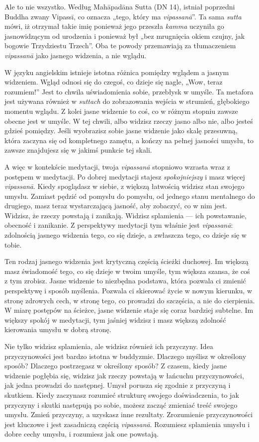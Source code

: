\documentclass[12pt,openany]{book}
\begin{document}
Ale to nie wszystko. Według Mahāpadāna Sutta (DN 14), istniał poprzedni Buddha zwany Vipassī, co oznacza „tego, który ma \textit{vipassanā}”. Ta sama \textit{sutta} mówi, iż otrzymał takie imię ponieważ jego przeszła  \textit{kamma} uczyniła go jasnowidzącym od urodzenia i ponieważ był „bez mrugnięcia okiem czujny, jak bogowie Trzydziestu Trzech”. Oba te powody przemawiają za tłumaczeniem  \textit{vipassanā} jako jasnego widzenia, a nie wglądu.

W języku angielskim istnieje istotna różnica pomiędzy wglądem a jasnym widzeniem. Wgląd odnosi się do czegoś, co dzieje się nagle, „Wow, teraz rozumiem!” Jest to chwila uświadomienia sobie, przebłysk w umyśle. Ta metafora jest używana również w \textit{suttach} do zobrazowania wejścia w strumień, głębokiego momentu wglądu. Z kolei jasne widzenie to coś, co w różnym stopniu zawsze obecne jest w umyśle. W tej chwili, albo widzisz rzeczy jasno albo nie, albo jesteś gdzieś pomiędzy. Jeśli wyobrazisz sobie jasne widzenie jako skalę przesuwną, która zaczyna się od kompletnego zamętu, a kończy na pełnej jasności umysłu, to zawsze znajdujesz się w jakimś punkcie tej skali.

A więc w kontekście medytacji, twoja \textit{vipassanā} stopniowo wzrasta wraz z postępem w medytacji. Po dobrej medytacji stajesz \textit{spokojniejszy} i masz więcej \textit{vipassanā}. Kiedy spoglądasz w siebie, z większą łatwością widzisz stan swojego umysłu. Zamiast pędzić od pomysłu do pomysłu, od jednego stanu mentalnego do drugiego, masz teraz wystarczającą jasność, aby zobaczyć, co w nim jest. Widzisz, że rzeczy powstają i zanikają. Widzisz splamienia --- ich powstawanie, obecność i zanikanie. Z perspektywy medytacji tym właśnie jest \textit{vipassanā}: zdolnością jasnego widzenia tego, co się dzieje, a zwłaszcza tego, co dzieje się w tobie.

Ten rodzaj jasnego widzenia jest krytyczną częścią ścieżki duchowej. Im większą masz świadomość tego, co się dzieje w twoim umyśle, tym większa szansa, że coś z tym zrobisz. Jasne widzenie to niezbędna podstawa, która pozwala ci zmienić perspektywę i sposób myślenia. Pozwala ci skierować życie w nowym kierunku, w stronę zdrowych cech, w stronę tego, co prowadzi do szczęścia, a nie do cierpienia. W miarę postępów na ścieżce, jasne widzenie staje się coraz bardziej subtelne. Im większy spokój w medytacji, tym jaśniej widzisz i masz większą zdolność kierowania umysłu w dobrą stronę.

Nie tylko widzisz splamienia, ale widzisz również ich przyczyny. Idea przyczynowości jest bardzo istotna w buddyzmie. Dlaczego myślisz w określony sposób? Dlaczego postrzegasz w określony sposób? Z czasem, kiedy jasne widzenie pogłębia się, widzisz jak rzeczy powstają w łańcuchu przyczynowości, jak jedna prowadzi do następnej. Umysł porusza się zgodnie z przyczyną i skutkiem. Kiedy zaczynasz rozumieć strukturę swojego doświadczenia, to jak przyczyny i skutki następują po sobie, możesz zacząć zmieniać treść swojego umysłu. Zmień przyczyny, a uzyskasz inne rezultaty. Zrozumienie przyczynowości jest kluczowe i jest zasadniczą częścią \textit{vipassanā}. Rozumiesz splamienia umysłu i dobre cechy umysłu, i rozumiesz jak one powstają.
\end{document}
